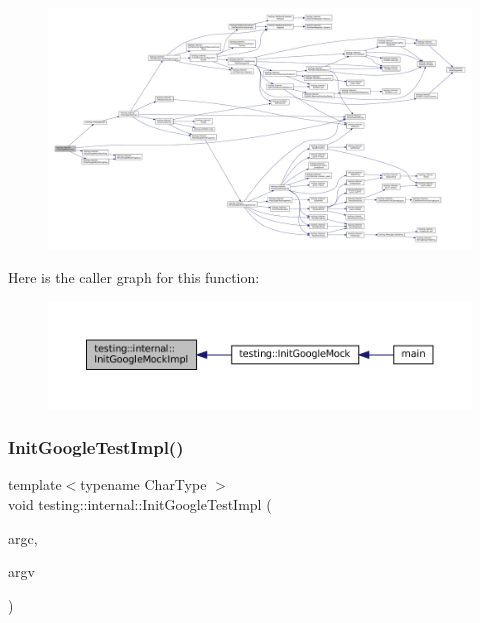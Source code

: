\begin{figure}[H]
\begin{center}
\leavevmode
\includegraphics[width=350pt]{namespacetesting_1_1internal_a3823844199df88af9493026031cf7744_cgraph}
\end{center}
\end{figure}
Here is the caller graph for this function\+:
\nopagebreak
\begin{figure}[H]
\begin{center}
\leavevmode
\includegraphics[width=350pt]{namespacetesting_1_1internal_a3823844199df88af9493026031cf7744_icgraph}
\end{center}
\end{figure}
\mbox{\label{namespacetesting_1_1internal_ac3c6fa93391768aa91c6238b31aaeeb5}} 
\subsubsection{\texorpdfstring{Init\+Google\+Test\+Impl()}{InitGoogleTestImpl()}}
{\footnotesize\ttfamily template$<$typename Char\+Type $>$ \\
void testing\+::internal\+::\+Init\+Google\+Test\+Impl (\begin{DoxyParamCaption}\item[{int $\ast$}]{argc,  }\item[{Char\+Type $\ast$$\ast$}]{argv }\end{DoxyParamCaption})}




